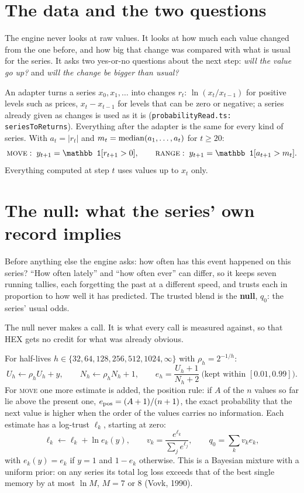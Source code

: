 \documentclass[10.5pt]{article}
\begin{document}
\section{The data and the two questions}
\begin{plain}
The engine never looks at raw values. It looks at how much each value changed from the one before, and how big that change was compared with what is usual for the series. It asks two yes-or-no questions about the next step: \emph{will the value go up?} and \emph{will the change be bigger than usual?}
\end{plain}
An adapter turns a series $x_0,x_1,\dots$ into changes $r_t$: $\ln(x_t/x_{t-1})$ for positive levels such as prices, $x_t-x_{t-1}$ for levels that can be zero or negative; a series already given as changes is used as it is (\texttt{probabilityRead.ts: seriesToReturns}). Everything after the adapter is the same for every kind of series. With $a_t=|r_t|$ and $m_t=\operatorname{median}(a_1,\dots,a_t)$ for $t\ge20$:
\[ \textsc{move}:\; y_{t+1}=\mathbb 1[r_{t+1}>0],\qquad \textsc{range}:\; y_{t+1}=\mathbb 1[a_{t+1}>m_t]. \]
Everything computed at step $t$ uses values up to $x_t$ only.

\section{The null: what the series' own record implies}
\begin{plain}
Before anything else the engine asks: how often has this event happened on this series? ``How often lately'' and ``how often ever'' can differ, so it keeps seven running tallies, each forgetting the past at a different speed, and trusts each in proportion to how well it has predicted. The trusted blend is the \textbf{null}, $q_0$: the series' usual odds.

The null never makes a call. It is what every call is measured against, so that HEX gets no credit for what was already obvious.
\end{plain}
For half-lives $h\in\{32,64,128,256,512,1024,\infty\}$ with $\rho_h=2^{-1/h}$:
\[ U_h\leftarrow\rho_hU_h+y,\qquad N_h\leftarrow\rho_hN_h+1,\qquad e_h=\frac{U_h+1}{N_h+2}\ \text{(kept within $[0.01,0.99]$)}. \]
For \textsc{move} one more estimate is added, the position rule: if $A$ of the $n$ values so far lie above the present one, $e_{\rm pos}=(A+1)/(n+1)$, the exact probability that the next value is higher when the order of the values carries no information. Each estimate has a log-trust $\ell_k$, starting at zero:
\[ \ell_k\leftarrow\ell_k+\ln e_k(y),\qquad v_k=\frac{e^{\ell_k}}{\sum_je^{\ell_j}},\qquad q_0=\sum_kv_ke_k, \]
with $e_k(y)=e_k$ if $y=1$ and $1-e_k$ otherwise. This is a Bayesian mixture with a uniform prior: on any series its total log loss exceeds that of the best single memory by at most $\ln M$, $M=7$ or $8$ (Vovk, 1990).
\end{document}
